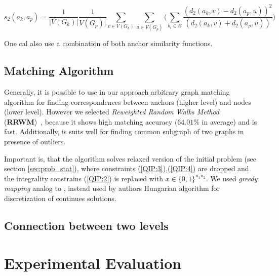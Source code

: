 \documentclass[
	fontsize=12pt,
	paper=a4,
	twoside=false,
	numbers=noenddot,
	plainheadsepline,
	toc=listof,
	toc=bibliography
]{scrartcl}
\begin{document}
\begin{equation}
s_2(a_k, a_p) = \frac{1}{|V(G_k)|}\frac{1}{V(G_p)|}\sum_{v\in V(G_k)}\sum_{u\in V(G_p)} \big(\sum_{b_i\in B}\frac{(d_2(a_k,v)-d_2(a_p,u))^2}{(d_2(a_k,v)+d_2(a_p,u))}\big)
\end{equation}

One cal also use a combination of both anchor similarity functions.











\subsection{Matching Algorithm}

Generally, it is possible to use in our approach arbitrary graph matching algorithm for finding correspondences between anchors (higher level) and nodes (lower level). However we selected \emph{Reweighted Random Walks Method} (\textbf{RRWM})~\cite{Cho2010_RRWM}, because it shows high matching accuracy ($64.01\%$ in average) and is fast. Additionally, is suits well for finding common subgraph of two graphs in presence of outliers.

Important is, that the algorithm solves relaxed version of the initial problem (see section \ref{sec:prob_stat}), where constraints (\ref{QIP:3}),(\ref{QIP:4}) are dropped and the integrality constrains (\ref{QIP:2}) is replaced with $x\in \{0,1\}^{n_1n_2}$. We used \emph{greedy mapping} analog to \cite{Leordeanu2005}, instead used by authors Hungarian algorithm for discretization of continues solutions.

\subsection{Connection between two levels}



\section{Experimental Evaluation}




	
\end{document}
